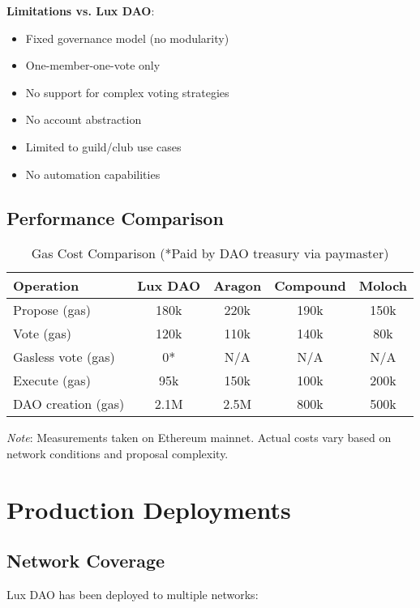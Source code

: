 \documentclass[11pt,a4paper]{article}
\begin{document}
\textbf{Limitations vs. Lux DAO}:
\begin{itemize}
    \item Fixed governance model (no modularity)
    \item One-member-one-vote only
    \item No support for complex voting strategies
    \item No account abstraction
    \item Limited to guild/club use cases
    \item No automation capabilities
\end{itemize}

\subsection{Performance Comparison}

\begin{table}[h]
\centering
\begin{tabular}{|l|c|c|c|c|}
\hline
\textbf{Operation} & \textbf{Lux DAO} & \textbf{Aragon} & \textbf{Compound} & \textbf{Moloch} \\
\hline
Propose (gas) & 180k & 220k & 190k & 150k \\
Vote (gas) & 120k & 110k & 140k & 80k \\
Gasless vote (gas) & 0* & N/A & N/A & N/A \\
Execute (gas) & 95k & 150k & 100k & 200k \\
DAO creation (gas) & 2.1M & 2.5M & 800k & 500k \\
\hline
\end{tabular}
\caption{Gas Cost Comparison (*Paid by DAO treasury via paymaster)}
\end{table}

\textit{Note}: Measurements taken on Ethereum mainnet. Actual costs vary based on network conditions and proposal complexity.

\section{Production Deployments}

\subsection{Network Coverage}

Lux DAO has been deployed to multiple networks:
\end{document}
